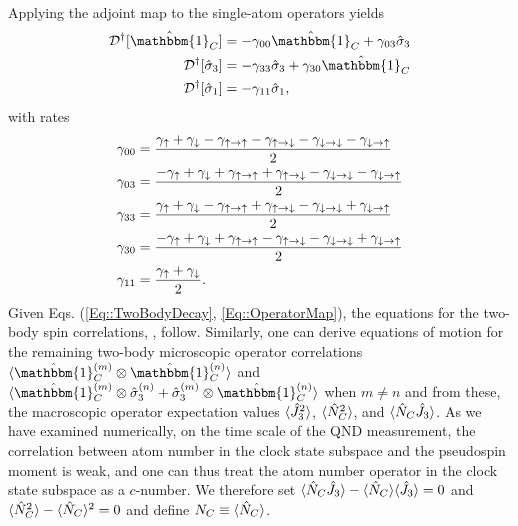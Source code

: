 Applying the adjoint map to the single-atom operators yields 
	\begin{subequations} \label{Eq::OperatorMap}
	\begin{align}
		\mathcal{D}\dg[\hat{\mathbbm{1}}_C] & = - \gamma_{00} \hat{\mathbbm{1}}_C +\gamma_{03} \hat{\sigma}_3 \label {Eq::Idecay} \\
		\mathcal{D}\dg[\hat{\sigma}_3] & =- \gamma_{33} \hat{\sigma}_3 +  \gamma_{30} \hat{\mathbbm{1}}_C 
\label{Eq::zdecay} \\
		\mathcal{D}\dg[\hat{\sigma}_1] & = - \gamma_{11} \hat{\sigma}_1\label{Eq::xdecay},
	\end{align}
	\end{subequations}
with rates	
	\begin{subequations} \label{Eq::DecayRates}
	\begin{align}
		\gamma_{00} 
			& = \frac{\gamma_{\uparrow}+\gamma_{\downarrow} - \gammauu-\gammaud  -\gammadd-\gammadu}{2} \label{Eq::lrate} \\
			\gamma_{03} 
			& = \frac{-\gamma_{\uparrow}+\gamma_{\downarrow} +\gammauu + \gammaud - \gammadd - \gammadu }{2}\\		
		\gamma_{33} 
			& = \frac{\gamma_{\uparrow}+\gamma_{\downarrow} - \gammauu+\gammaud  -\gammadd+\gammadu}{2}\\
			\gamma_{30} 
			& = \frac{-\gamma_{\uparrow} + \gamma_{\downarrow} + \gammauu - \gammaud - \gammadd + \gammadu }{2} \\
			\gamma_{11} 
			& = \frac{\gamma_{\uparrow}+\gamma_{\downarrow}}{2}. \label{Eq::frate}
	\end{align}
	\end{subequations}
Given Eqs. (\ref{Eq::TwoBodyDecay}, \ref{Eq::OperatorMap}), the equations for the two-body spin correlations, , follow.  Similarly, one can derive equations of motion for the remaining two-body microscopic operator correlations $ \expt{\hat{\mathbbm{1}}^{(m)}_C \otimes \hat{\mathbbm{1}}^{(n)}_C} $ and $ \expt{\hat{\mathbbm{1}}^{(m)}_C \otimes \hat{\sigma}_3^{(n)} + \hat{\sigma}_3^{(m)} \otimes \hat{\mathbbm{1}}^{(n)}_C } $ when $ m\neq n $ and from these, the macroscopic operator expectation values $ \langle{\hat{J}_3^2}\rangle $, $ \langle{\hat{N}_C^2}\rangle $, and $ \langle{\hat{N}_C\hat{J}_3}\rangle $.  As we have examined numerically, on the time scale of the QND measurement, the correlation between atom number in the clock state subspace and the pseudospin moment is weak, and one can thus treat the atom number operator in the clock state subspace as a $c$-number.
We therefore set $ \langle{\hat{N}_C\hat{J}_3}\rangle-\langle{\hat{N}_C}\rangle\langle{\hat{J}_3}\rangle = 0 $ and $ \langle{\hat{N}_C^2}\rangle - \langle{\hat{N}_C}\rangle^2 = 0 $ and define $ N_C\equiv \langle{\hat{N}_C}\rangle$. 

